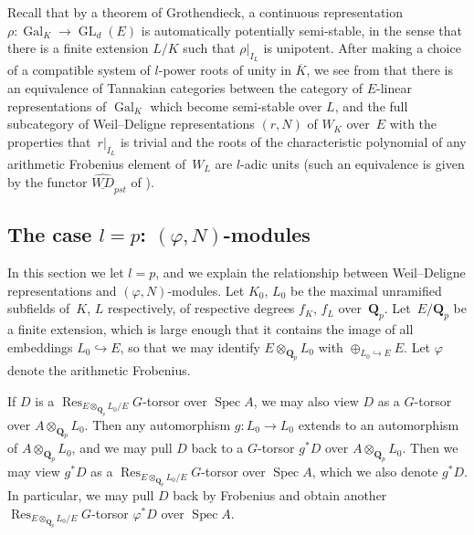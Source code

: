 \documentclass{amsart}
\renewcommand{\mathbb}{\mathbf}
\theoremstyle{definition}
\theoremstyle{remark}
\newcommand{\mar}[1]{}
\newcommand{\mar}[1]{\marginpar{\raggedright\tiny squirrel #1}}
\newcommand{\Q}{\QQ}
\newcommand{\QQ}{{\mathbb Q}}
\newcommand{\Qp}{\Q_p}
\DeclareMathOperator{\Gal}{Gal}
\DeclareMathOperator{\GL}{GL}
\DeclareMathOperator{\Spec}{Spec}
\newcommand{\into}{\hookrightarrow}
\newcommand{\Res}{\operatorname{Res}}
\begin{document}
Recall that by a theorem of Grothendieck, a continuous representation
$\rho:\Gal_K\to\GL_d(E)$ is automatically potentially semi-stable, in the
sense that there is a finite extension $L/K$ such that $\rho|_{I_L}$
is unipotent. After making a choice of a compatible system of $l$-power
roots of unity in $\overline{K}$, we see from \cite[Prop.\ 1.3.3,
2.3.4]{fonl} that there is an equivalence of Tannakian categories
between the category of $E$-linear representations of $\Gal_K$ which
become semi-stable over $L$, and the full subcategory of Weil--Deligne
representations $(r,N)$ of $W_K$ over~$E$ with the properties
that~$r|_{I_L}$ %
is trivial and  the roots of the characteristic polynomial
of any arithmetic Frobenius element of~$W_L$ are $l$-adic units (such an equivalence is given by the
functor $\widehat{\underline{WD}}_{pst}$ of \cite[\S
2.3.7]{fonl}).   %

\subsection{The case $l=p$: 
  $(\varphi,N)$-modules}\label{subsec: phi N modules versus WD
  representations}In this section we let $l=p$, and we explain the
relationship between Weil--Deligne representations and
$(\varphi,N)$-modules. Let $K_0$, $L_0$ be the
maximal unramified subfields of~$K$, $L$ respectively, of respective
degrees $f_K$, $f_L$ over~$\Qp$. Let~$E/\Qp$ be a finite extension,
which is large enough that it contains the image of all embeddings
$L_0\into E$, %
so that we may identify $E\otimes_{\Q_p}L_0$ with
$\oplus_{L_0\hookrightarrow E}E$.  Let $\varphi$ denote the arithmetic
Frobenius.

If $D$ is a $\Res_{E\otimes_{\Qp}L_0/E}G$-torsor over $\Spec A$, we may also view $D$ as a $G$-torsor over $A\otimes_{\Qp}L_0$.  Then any automorphism $g:L_0\rightarrow L_0$ extends to an automorphism of $A\otimes_{\Qp}L_0$, and we may pull $D$ back to a $G$-torsor $g^\ast D$ over $A\otimes_{\Qp}L_0$.  Then we may view $g^\ast D$ as a $\Res_{E\otimes_{\Qp}L_0/E}G$-torsor over $\Spec A$, which we also denote $g^\ast D$.  In particular, we may pull $D$ back by Frobenius and obtain another $\Res_{E\otimes_{\Qp}L_0/E}G$-torsor $\varphi^\ast D$ over $\Spec A$.
\end{document}
